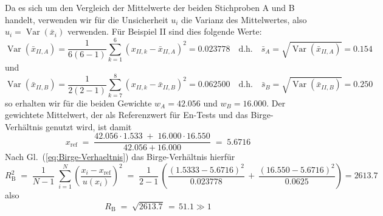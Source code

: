 Da es sich um den Vergleich der Mittelwerte der beiden Stichproben A und B handelt, verwenden wir
für die Unsicherheit $u_i$ die Varianz des Mittelwertes, also
$u_i = \operatorname{Var}(\bar x_i)$ verwenden. Für Beispiel II sind dies folgende Werte:
$$
\operatorname{Var}(\bar x_{II,A}) = \frac{1}{6(6-1)} \sum\limits_{k=1}^{6} \left(x_{II,k} - \bar x_{II,A} \right)^2 = 0.023778
\quad \text{d.h.} \quad \bar s_A = \sqrt{\operatorname{Var}(\bar x_{II,A})} = 0.154
$$
und
$$
\operatorname{Var}(\bar x_{II,B}) = \frac{1}{2(2-1)} \sum\limits_{k=7}^{8} \left(x_{II,k} - \bar x_{II,B} \right)^2 = 0.062500
\quad \text{d.h.} \quad \bar s_B = \sqrt{\operatorname{Var}(\bar x_{II,B})} = 0.250
$$
so erhalten wir für die beiden Gewichte $w_A = 42.056$ und $w_B = 16.000$.
Der gewichtete Mittelwert, der als Referenzwert für En-Tests und das Birge-Verhältnis genutzt wird, ist damit
$$
x_\mathrm{ref} \; = \; \frac{42.056 \cdot 1.533 \; + \; 16.000 \cdot 16.550}{42.056 + 16.000}
\; = \; 5.6716
$$
Nach Gl.~(\ref{eq:Birge-Verhaeltnis}) das Birge-Verhältnis hierfür
$$
R^2_\mathrm{B} \; = \; \frac{1}{N-1} \; \sum_{i=1}^N \left( \frac{x_i-x_\mathrm{ref}}{u(x_i)} \right)^2 \; = \;
 \frac{1}{2-1} \, \left( \frac{\left(1.5333 - 5.6716\right)^2}{0.023778}
 \, + \, \frac{ \left( 16.550 - 5.6716 \right)^2}{0.0625} \right) = 2613.7
$$
also
$$
R_\mathrm{B} \; = \; \sqrt{2613.7} \, = \, 51.1  \gg 1
$$

